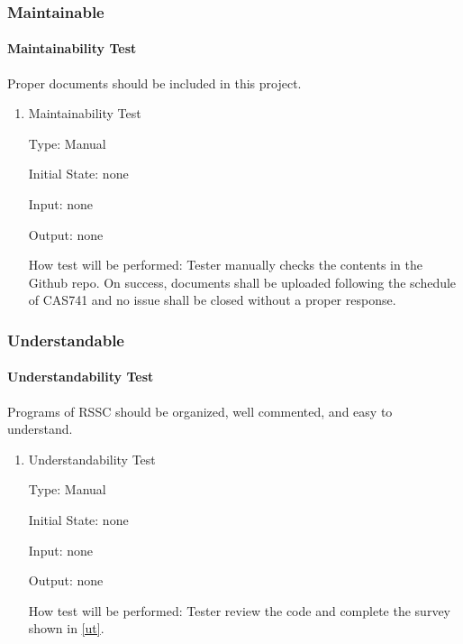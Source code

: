 \documentclass[12pt, titlepage]{article}
\begin{document}
\subsubsection{Maintainable}\label{Amaintain}

\paragraph{Maintainability Test} Proper documents should be included
in this project. 

\begin{enumerate}
\item{Maintainability Test\\}

Type: Manual
					
Initial State: none
					
Input: none
					
Output: none
					
How test will be performed: Tester manually checks the contents in the
Github repo. On success, documents shall be uploaded following the schedule
of CAS741 and no issue shall be closed without a proper response.

\end{enumerate}

\subsubsection{Understandable}\label{Audst}

\paragraph{Understandability Test} Programs of RSSC should be organized,
well commented, and easy to understand.

\begin{enumerate}
\item{Understandability Test\\}

Type: Manual
					
Initial State: none
					
Input: none
					
Output: none
					
How test will be performed: Tester review the code and complete the survey
shown in \autoref{ut}.

\end{enumerate}
\end{document}
